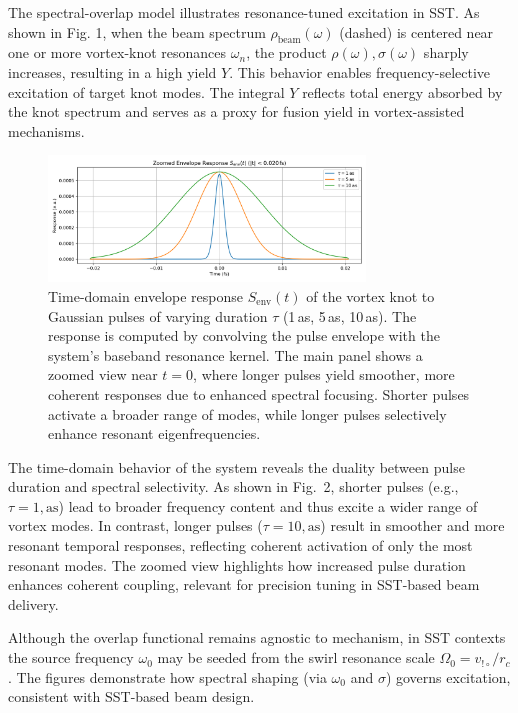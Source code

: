 \documentclass[aps,prb,amsmath,amssymb]{revtex4-2} %
\begin{document}
    The spectral-overlap model illustrates resonance-tuned excitation in SST. As shown in Fig. 1, when the beam spectrum $\rho_{\mathrm{beam}}(\omega)$ (dashed) is centered near one or more vortex-knot resonances $\omega_n$, the product $\rho(\omega),\sigma(\omega)$ sharply increases, resulting in a high yield $Y$. This behavior enables frequency-selective excitation of target knot modes. The integral $Y$ reflects total energy absorbed by the knot spectrum and serves as a proxy for fusion yield in vortex-assisted mechanisms.

    \begin{figure}[h!]
        \centering
        \includegraphics[width=0.75\textwidth]{sst_time_response_env_zoom}
        \caption{Time-domain envelope response $S_{\mathrm{env}}(t)$ of the vortex knot to Gaussian pulses of varying duration $\tau$ (1\,as, 5\,as, 10\,as). The response is computed by convolving the pulse envelope with the system’s baseband resonance kernel.
        The main panel shows a zoomed view near $t=0$, where longer pulses yield smoother, more coherent responses due to enhanced spectral focusing.
        Shorter pulses activate a broader range of modes, while longer pulses selectively enhance resonant eigenfrequencies.
        }
    \end{figure}


    The time-domain behavior of the system reveals the duality between pulse duration and spectral selectivity. As shown in Fig.~2, shorter pulses (e.g., $\tau = 1,\mathrm{as}$) lead to broader frequency content and thus excite a wider range of vortex modes. In contrast, longer pulses ($\tau = 10,\mathrm{as}$) result in smoother and more resonant temporal responses, reflecting coherent activation of only the most resonant modes. The zoomed view highlights how increased pulse duration enhances coherent coupling, relevant for precision tuning in SST-based beam delivery.


    Although the overlap functional remains agnostic to mechanism, in SST contexts the source frequency $\omega_0$ may be seeded from the swirl resonance scale $\Omega_0 = v_{!\circ} / r_c$. The figures demonstrate how spectral shaping (via $\omega_0$ and $\sigma$) governs excitation, consistent with SST-based beam design.
\end{document}
